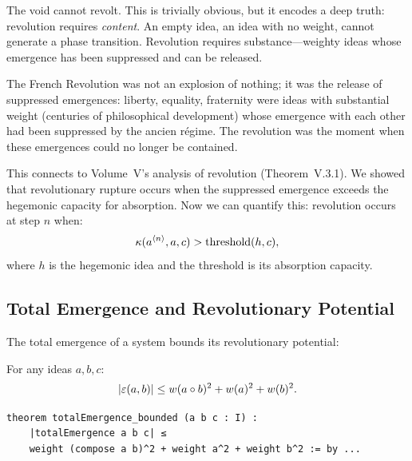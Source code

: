 \begin{interpretation}
The void cannot revolt. This is trivially obvious, but it encodes a deep truth:
revolution requires \emph{content}. An empty idea, an idea with no weight,
cannot generate a phase transition. Revolution requires substance---weighty
ideas whose emergence has been suppressed and can be released.

The French Revolution was not an explosion of nothing; it was the release of
suppressed emergences: liberty, equality, fraternity were ideas with substantial
weight (centuries of philosophical development) whose emergence with each other
had been suppressed by the ancien régime. The revolution was the moment when
these emergences could no longer be contained.

This connects to Volume~V's analysis of revolution (Theorem~V.3.1). We showed
that revolutionary rupture occurs when the suppressed emergence exceeds the
hegemonic capacity for absorption. Now we can quantify this: revolution occurs
at step $n$ when:
\[
  \kappa(a^{\langle n \rangle}, a, c) > \text{threshold}(h, c),
\]
where $h$ is the hegemonic idea and the threshold is its absorption capacity.
\end{interpretation}

\subsection{Total Emergence and Revolutionary Potential}

The total emergence of a system bounds its revolutionary potential:

\begin{theorem}
\label{thm:total-emergence-bound}
For any ideas $a, b, c$:
\[
  |\varepsilon(a, b)| \leq w(a \circ b)^2 + w(a)^2 + w(b)^2.
\]
\end{theorem}

\begin{lstlisting}[caption={Total emergence bounded (IDT\_v3\_Emergence.lean)}]
theorem totalEmergence_bounded (a b c : I) :
    |totalEmergence a b c| ≤
    weight (compose a b)^2 + weight a^2 + weight b^2 := by ...
\end{lstlisting}

